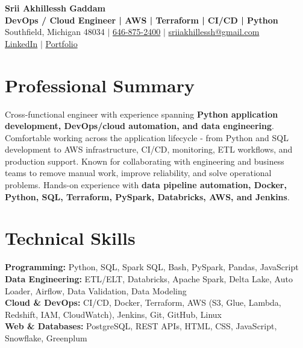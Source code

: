 \documentclass[letterpaper,10pt]{article}
\begin{document}
\fontsize{9.35pt}{10.45pt}\selectfont

\begin{center}
    {\LARGE \textbf{Srii Akhillessh Gaddam}} \\[-1pt]
    \textbf{DevOps / Cloud Engineer | AWS | Terraform | CI/CD | Python} \\[2pt]
    Southfield, Michigan 48034 $|$
    \href{tel:6468752400}{646-875-2400} $|$
    \href{mailto:sriiakhillessh@gmail.com}{sriiakhillessh@gmail.com} \\[1pt]
    \href{https://www.linkedin.com/in/srii-akhiilessh-gaddam-b48668191/}{LinkedIn} $|$
    \href{https://sriiakhillesshg.github.io/portfolio/}{Portfolio}
\end{center}
\vspace{-8pt}

\section{Professional Summary}
\small{Cross-functional engineer with experience spanning \textbf{Python application development, DevOps/cloud automation, and data engineering}. Comfortable working across the application lifecycle - from Python and SQL development to AWS infrastructure, CI/CD, monitoring, ETL workflows, and production support. Known for collaborating with engineering and business teams to remove manual work, improve reliability, and solve operational problems. Hands-on experience with \textbf{data pipeline automation, Docker, Python, SQL, Terraform, PySpark, Databricks, AWS, and Jenkins}.}

\section{Technical Skills}
\small{
\textbf{Programming:} Python, SQL, Spark SQL, Bash, PySpark, Pandas, JavaScript \\
\textbf{Data Engineering:} ETL/ELT, Databricks, Apache Spark, Delta Lake, Auto Loader, Airflow, Data Validation, Data Modeling \\
\textbf{Cloud \& DevOps:} CI/CD, Docker, Terraform, AWS (S3, Glue, Lambda, Redshift, IAM, CloudWatch), Jenkins, Git, GitHub, Linux \\
\textbf{Web \& Databases:} PostgreSQL, REST APIs, HTML, CSS, JavaScript, Snowflake, Greenplum
}
\end{document}
